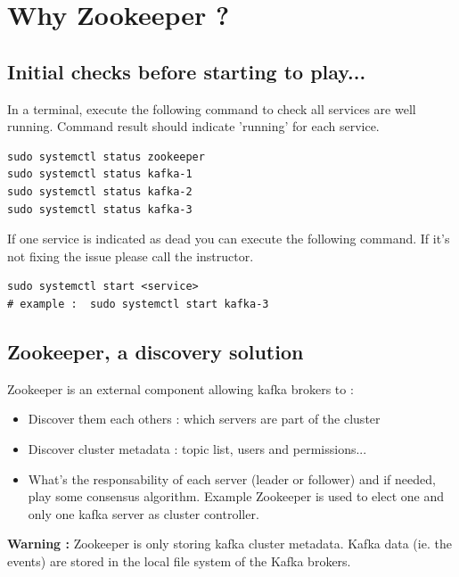 \documentclass{article}
\newenvironment{warning}
    { \begin{mdframed}[backgroundcolor=blue!20] \textbf{Warning : } }
    {  \end{mdframed}}
\newenvironment{code}
    { \begin{mdframed} }    {  \end{mdframed}}
\begin{document}
\section{Why Zookeeper ?}
\subsection{Initial checks before starting to play...}
In a terminal, execute the following command to check all services are well running. Command result should indicate 'running' for each service. 

\begin{code}
    \begin{verbatim}
sudo systemctl status zookeeper
sudo systemctl status kafka-1
sudo systemctl status kafka-2
sudo systemctl status kafka-3\end{verbatim}
\end{code}

If one service is indicated as dead you can execute the following command. If it's not fixing the issue please call the instructor.

\begin{code}
    \begin{verbatim}
sudo systemctl start <service>
# example :  sudo systemctl start kafka-3
    \end{verbatim}
\end{code}

\subsection{Zookeeper, a discovery solution}
Zookeeper is an external component allowing kafka brokers to : 
\begin{itemize}
\item Discover them each others : which servers are part of the cluster 
\item Discover cluster metadata : topic list, users and permissions...
\item What's the responsability of each server (leader or follower) and if needed, play some consensus algorithm. Example Zookeeper is used to elect one and only one kafka server as cluster controller.
\end{itemize}

\begin{warning}
Zookeeper is only storing kafka cluster metadata. Kafka data (ie. the events) are stored in the local file system of the Kafka brokers.
\end{warning}
\end{document}
